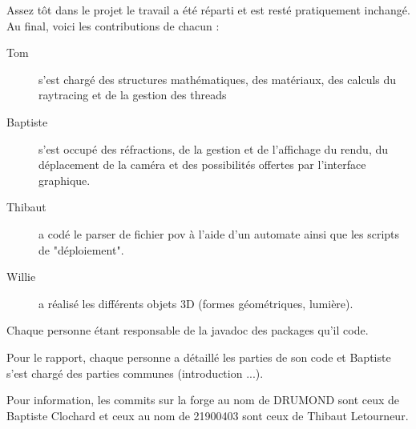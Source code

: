 Assez tôt dans le projet le travail a été réparti et est resté pratiquement inchangé. Au final, voici les contributions de chacun :
\begin{description}
    \item [Tom] s'est chargé des structures mathématiques, des matériaux, des calculs du raytracing et de la gestion des threads
    \item [Baptiste] s'est occupé des réfractions, de la gestion et de l'affichage du rendu, du déplacement de la caméra et des possibilités offertes par l'interface graphique.
    \item [Thibaut] a codé le parser de fichier pov à l'aide d'un automate ainsi que les scripts de "déploiement".
    \item [Willie] a réalisé les différents objets 3D (formes géométriques, lumière).
\end{description}

Chaque personne étant responsable de la javadoc des packages qu'il code.

Pour le rapport, chaque personne a détaillé les parties de son code et Baptiste s'est chargé des parties communes (introduction ...).

Pour information, les commits sur la forge au nom de DRUMOND sont ceux de Baptiste Clochard et ceux au nom de 21900403 sont ceux de Thibaut Letourneur.
